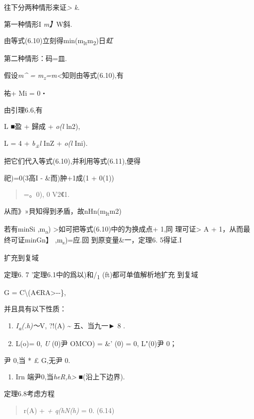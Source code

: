 \documentclass{article}
\begin{document}
往下分两种情形来证\emph{\textgreater{} k.}

第一种情形I \emph{m】}W斜.

由等式(6.10)立刻得min(m\textsubscript{lt}m\textsubscript{2})日\emph{虹}

第二种情形：码=皿.

假设\emph{m\^{} = m\textsubscript{z}=m\textless{}}知则由等式(6.10),有

祐+ Mi = 0・

由引理6.6,有

L ■盈 + 歸成 + \emph{o(l} ln2),

L = 4 + \emph{b\textsubscript{±}l} InZ + \emph{o(l} Ini).

把它们代入等式(6.10),并利用等式(6.11),便得

祀)=0(3高I - \&而)肿+1成(1 + 0(1))

\begin{quote}
=。0), 0 V2《1.
\end{quote}

从而》»貝知得到矛盾，故nHn(m\textsubscript{lt}m2)

若有minSi ,m\textsubscript{a})
\textgreater{}如可把等式(6.10)中的为换成点+ 1,同 理可证\textgreater{} A
+ 1，从而最终可证minGn】 ,m\textsubscript{s})=应.回 到原变量\&一，定理6.
5得证.I

扩充到复域

定理6. 7 '定理6.1中的爲以)和/\textsubscript{1} (ft)都可单值解析地扩充
到复域

G = C\textbackslash{}(A€R\textbar{}A\textgreater{}-\textbar{}-\},

并且具有以下性质：

\begin{enumerate}
\def\labelenumi{(\arabic{enumi})}
\item
  \emph{I\textsubscript{a}(.h)〜}V, ?!(A) \textasciitilde{} 五、当九一►
  8 .
\item
  L(o)= 0, \emph{U} (0)尹 OMCO) = \&' (0) = 0, L"(0)尹 0；
\end{enumerate}

尹 0,当 * £ G,无尹 0.

\begin{enumerate}
\def\labelenumi{(\arabic{enumi})}
\setcounter{enumi}{2}
\item
  Irn 端尹0,当\emph{heR,h\textgreater{}} ■(沿上下边界).
\end{enumerate}

定理6.8考虑方程

\begin{quote}
r(A) + \emph{+ q(hN(h)} = 0. (6.14)
\end{quote}
\end{document}
